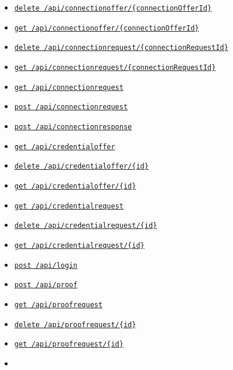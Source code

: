 \begin{itemize}
\tightlist
\item
  \protect\hyperlink{apiConnectionofferConnectionOfferIdDelete}{\texttt{delete\ /api/connectionoffer/\{connectionOfferId\}}}
\item
  \protect\hyperlink{apiConnectionofferConnectionOfferIdGet}{\texttt{get\ /api/connectionoffer/\{connectionOfferId\}}}
\item
  \protect\hyperlink{apiConnectionrequestConnectionRequestIdDelete}{\texttt{delete\ /api/connectionrequest/\{connectionRequestId\}}}
\item
  \protect\hyperlink{apiConnectionrequestConnectionRequestIdGet}{\texttt{get\ /api/connectionrequest/\{connectionRequestId\}}}
\item
  \protect\hyperlink{apiConnectionrequestGet}{\texttt{get\ /api/connectionrequest}}
\item
  \protect\hyperlink{apiConnectionrequestPost}{\texttt{post\ /api/connectionrequest}}
\item
  \protect\hyperlink{apiConnectionresponsePost}{\texttt{post\ /api/connectionresponse}}
\item
  \protect\hyperlink{apiCredentialofferGet}{\texttt{get\ /api/credentialoffer}}
\item
  \protect\hyperlink{apiCredentialofferIdDelete}{\texttt{delete\ /api/credentialoffer/\{id\}}}
\item
  \protect\hyperlink{apiCredentialofferIdGet}{\texttt{get\ /api/credentialoffer/\{id\}}}
\item
  \protect\hyperlink{apiCredentialrequestGet}{\texttt{get\ /api/credentialrequest}}
\item
  \protect\hyperlink{apiCredentialrequestIdDelete}{\texttt{delete\ /api/credentialrequest/\{id\}}}
\item
  \protect\hyperlink{apiCredentialrequestIdGet}{\texttt{get\ /api/credentialrequest/\{id\}}}
\item
  \protect\hyperlink{apiLoginPost}{\texttt{post\ /api/login}}
\item
  \protect\hyperlink{apiProofPost}{\texttt{post\ /api/proof}}
\item
  \protect\hyperlink{apiProofrequestGet}{\texttt{get\ /api/proofrequest}}
\item
  \protect\hyperlink{apiProofrequestIdDelete}{\texttt{delete\ /api/proofrequest/\{id\}}}
\item
  \protect\hyperlink{apiProofrequestIdGet}{\texttt{get\ /api/proofrequest/\{id\}}}
\item

\end{itemize}
